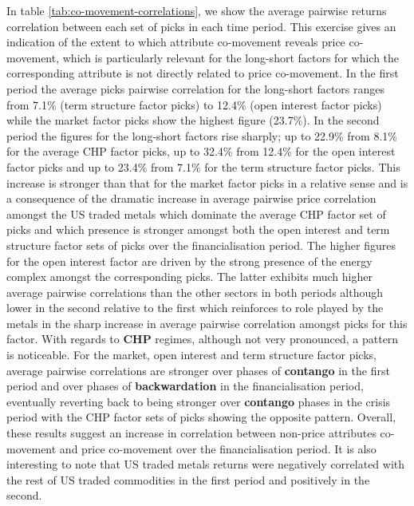 \documentclass[]{elsarticle} %
\begin{document}
In table \ref{tab:co-movement-correlations}, we show the average pairwise returns correlation between each set of picks in each time period. This exercise gives an indication of the extent to which attribute co-movement reveals price co-movement, which is particularly relevant for the long-short factors for which the corresponding attribute is not directly related to price co-movement. In the first period the average picks pairwise correlation for the long-short factors ranges from 7.1\% (term structure factor picks) to 12.4\% (open interest factor picks) while the market factor picks show the highest figure (23.7\%). In the second period the figures for the long-short factors rise sharply; up to 22.9\% from 8.1\% for the average CHP factor picks, up to 32.4\% from 12.4\% for the open interest factor picks and up to 23.4\% from 7.1\% for the term structure factor picks. This increase is stronger than that for the market factor picks in a relative sense and is a consequence of the dramatic increase in average pairwise price correlation amongst the US traded metals which dominate the average CHP factor set of picks and which presence is stronger amongst both the open interest and term structure factor sets of picks over the financialisation period. The higher figures for the open interest factor are driven by the strong presence of the energy complex amongst the corresponding picks. The latter exhibits much higher average pairwise correlations than the other sectors in both periods although lower in the second relative to the first which reinforces to role played by the metals in the sharp increase in average pairwise correlation amongst picks for this factor. With regards to \textbf{CHP} regimes, although not very pronounced, a pattern is noticeable. For the market, open interest and term structure factor picks, average pairwise correlations are stronger over phases of \textbf{contango} in the first period and over phases of \textbf{backwardation} in the financialisation period, eventually reverting back to being stronger over \textbf{contango} phases in the crisis period with the CHP factor sets of picks showing the opposite pattern. Overall, these results suggest an increase in correlation between non-price attributes co-movement and price co-movement over the financialisation period. It is also interesting to note that US traded metals returns were negatively correlated with the rest of US traded commodities in the first period and positively in the second.
\end{document}
